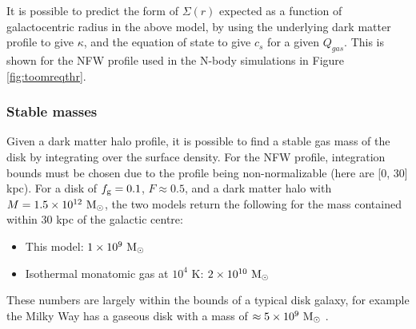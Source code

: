 It is possible to predict the form of $\Sigma(r)$ expected as a function of galactocentric radius in the above model, by using the underlying dark matter profile to give $\kappa$, and the equation of state to give $c_s$ for a given $Q_{gas}$.
This is shown for the NFW profile used in the N-body simulations in Figure \ref{fig:toomreqthr}.

\subsubsection{Stable masses}

Given a dark matter halo profile, it is possible to find a stable gas mass of the disk by integrating over the surface density.
For the NFW profile, integration bounds must be chosen due to the profile being non-normalizable (here are [0, 30] kpc).
For a disk of $f_\mathrm{g}=0.1$, $F \approx 0.5$, and a dark matter halo with $M = 1.5\times10^{12} ~\mathrm{M}_{\odot}$, the two models return the following for the mass contained within 30 kpc of the galactic centre:
\begin{itemize}
    \item This model: $1 \times 10^9 ~\mathrm{M}_{\odot}$
    \item Isothermal monatomic gas at $10^4$ K: $2 \times 10^{10}~\mathrm{M}_{\odot}$
\end{itemize}
These numbers are largely within the bounds of a typical disk galaxy, for example the Milky Way has a gaseous disk with a mass of $\approx 5\times10^9 ~\mathrm{M}_{\odot}$ \citep{licquia_improved_2013}.
